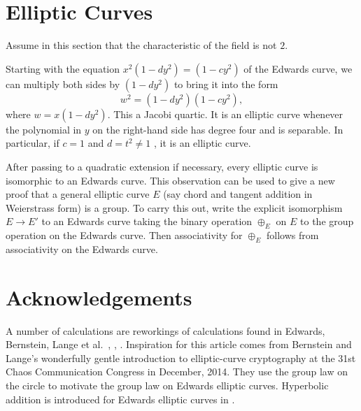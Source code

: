 \documentclass[12pt]{article}
\begin{document}
\section{Elliptic Curves}\label{sec:elliptic}

Assume in this section that the characteristic of the field is not
$2$.



Starting with the equation $x^2 (1-d y^2) = (1 - c y^2)$ of the
Edwards curve, we can multiply both sides by $(1- d y^2)$ to bring it
into the form
\[
w^2 = (1 - d y^2) (1 - c y^2),
\]
where $w = x (1 - d y^2)$.  This a Jacobi quartic.  It is an elliptic
curve whenever the polynomial in $y$ on the right-hand side has degree
four and is separable.  In particular, if $c=1$ and $d=t^2\ne 1$ , it is an
elliptic curve.

After passing to a quadratic extension if necessary, every elliptic
curve is isomorphic to an Edwards curve.  This observation can be used
to give a new proof that a general elliptic curve $E$ (say chord and
tangent addition in Weierstrass form) is a group.  To carry this out,
write the explicit isomorphism $E\to E'$ to an Edwards curve taking
the binary operation $\oplus_E$ on $E$ to the group operation on the
Edwards curve.  Then associativity for $\oplus_E$ follows from
associativity on the Edwards curve.

\section{Acknowledgements}

A number of calculations are reworkings of calculations found in
Edwards, Bernstein, Lange et al.~\cite{edwards2007normal},
\cite{bernstein2008twisted}, \cite{bernstein2007faster}.  Inspiration
for this article comes from Bernstein and Lange's wonderfully gentle
introduction to elliptic-curve cryptography at the 31st Chaos
Communication Congress in December, 2014.  They use the group law on
the circle to motivate the group law on Edwards elliptic curves.
Hyperbolic addition is introduced for Edwards elliptic curves in
\cite{arene2011faster}.  

 

\end{document}
